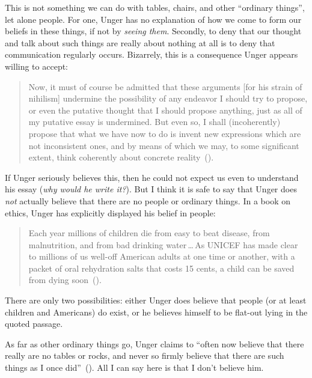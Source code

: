 \documentclass[11pt]{article}
\newenvironment{squote}{\begin{quote}\begin{singlespace}}{\end{singlespace}\end{quote}}
\begin{document}
\begin{spacing}{1.5}
This is not something we can do with tables, chairs, and other ``ordinary things'', let alone people. For one, Unger has no explanation of how we come to form our beliefs in these things, if not by {\em seeing them}. Secondly, to deny that our thought and talk about such things are really about nothing at all is to deny that communication regularly occurs. Bizarrely, this is a consequence Unger appears willing to accept:
\begin{squote}
Now, it must of course be admitted that these arguments [for his strain of nihilism] undermine the possibility of any endeavor I should try to propose, or even the putative thought that I should propose anything, just as all of my putative essay is undermined. But even so, I shall (incoherently) propose that what we have now to do is invent new expressions which are not inconsistent ones, and by means of which we may, to some significant extent, think coherently about concrete reality~(\citeyear[544]{unger1980b}).
\end{squote}
If Unger seriously believes this, then he could not expect us even to understand his essay ({\em why would he write it?}). But I think it is safe to say that Unger does {\em not} actually believe that there are no people or ordinary things. In a book on ethics, Unger has explicitly displayed his belief in people:

\begin{squote}
Each year millions of children die from easy to beat disease, from malnutrition, and from bad drinking water\,\ldots\,As UNICEF has made clear to millions of us well-off American adults at one time or another, with a packet of oral rehydration salts that costs 15 cents, a child can be saved from dying soon~(\citeyear[3]{unger1996}).
\end{squote}
There are only two possibilities: either Unger does believe that people (or at least children and Americans) do exist, or he believes himself to be flat-out lying in the quoted passage.

As far as other ordinary things go, Unger claims to ``often now believe that there really are no tables or rocks, and never so firmly believe that there are such things as I once did''~(\citeyear[543]{unger1980b}). All I can say here is that I don't believe him.



\end{spacing}
\end{document}
